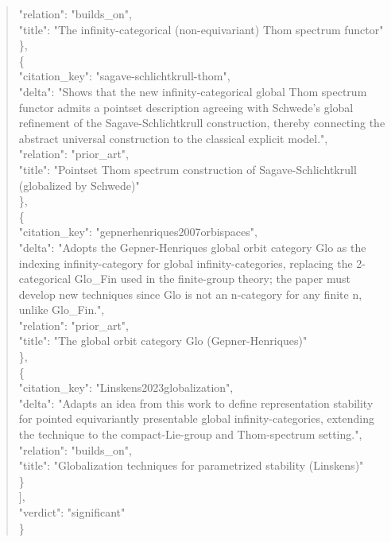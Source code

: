 \documentclass[11pt]{article}
\begin{document}
\begin{quote}
      "relation": "builds\_on",\\
      "title": "The infinity-categorical (non-equivariant) Thom spectrum functor"\\
    \},\\
    \{\\
      "citation\_key": "sagave-schlichtkrull-thom",\\
      "delta": "Shows that the new infinity-categorical global Thom spectrum functor admits a pointset description agreeing with Schwede's global refinement of the Sagave-Schlichtkrull construction, thereby connecting the abstract universal construction to the classical explicit model.",\\
      "relation": "prior\_art",\\
      "title": "Pointset Thom spectrum construction of Sagave-Schlichtkrull (globalized by Schwede)"\\
    \},\\
    \{\\
      "citation\_key": "gepnerhenriques2007orbispaces",\\
      "delta": "Adopts the Gepner-Henriques global orbit category Glo as the indexing infinity-category for global infinity-categories, replacing the 2-categorical Glo\_Fin used in the finite-group theory; the paper must develop new techniques since Glo is not an n-category for any finite n, unlike Glo\_Fin.",\\
      "relation": "prior\_art",\\
      "title": "The global orbit category Glo (Gepner-Henriques)"\\
    \},\\
    \{\\
      "citation\_key": "Linskens2023globalization",\\
      "delta": "Adapts an idea from this work to define representation stability for pointed equivariantly presentable global infinity-categories, extending the technique to the compact-Lie-group and Thom-spectrum setting.",\\
      "relation": "builds\_on",\\
      "title": "Globalization techniques for parametrized stability (Linskens)"\\
    \}\\
  ],\\
  "verdict": "significant"\\
\}\\
\end{quote}
\end{document}
